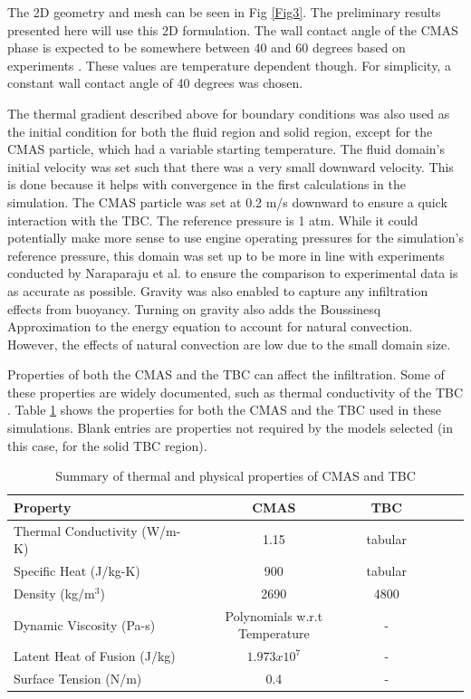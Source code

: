 \documentclass[conf]{new-aiaa}
\begin{document}
The 2D geometry and mesh can be seen in Fig \ref{Fig3}. The preliminary results presented here will use this 2D formulation. The wall contact angle of the CMAS phase is expected to be somewhere between 40 and 60 degrees based on experiments \cite{Naraparaju2019}. These values are temperature dependent though. For simplicity, a constant wall contact angle of 40 degrees was chosen.  


The thermal gradient described above for boundary conditions was also used as the initial condition for both the fluid region and solid region, except for the CMAS particle, which had a variable starting temperature. The fluid domain's initial velocity was set such that there was a very small downward velocity. This is done because it helps with convergence in the first calculations in the simulation. The CMAS particle was set at 0.2 m/s downward to ensure a quick interaction with the TBC. The reference pressure is 1 atm. While it could potentially make more sense to use engine operating pressures for the simulation's reference pressure, this domain was set up to be more in line with experiments conducted by Naraparaju et al. \cite{Naraparaju2014, Naraparaju2017, Naraparaju2019} to ensure the comparison to experimental data is as accurate as possible. Gravity was also enabled to capture any infiltration effects from buoyancy. Turning on gravity also adds the Boussinesq Approximation to the energy equation to account for natural convection. However, the effects of natural convection are low due to the small domain size.

Properties of both the CMAS and the TBC can affect the infiltration. Some of these properties are widely documented, such as thermal conductivity of the TBC \cite{Han2023}. Table \ref{tab:CMAS and TBC properties} shows the properties for both the CMAS and the TBC used in these simulations. Blank entries are properties not required by the models selected (in this case, for the solid TBC region).


\begin{table}
\caption{\label{tab:CMAS and TBC properties} Summary of thermal and physical properties of CMAS and TBC}
\centering
\begin{tabular}{lcccccc}
\hline
Property & CMAS& TBC\\\hline
Thermal Conductivity (W/m-K)& 1.15 \cite{Bakal2017} & tabular \cite{Han2023} \\
Specific Heat (J/kg-K)& 900 \cite{KAKUDA2015350} & tabular \cite{Han2023} \\
Density (kg/m$^3$)& 2690 \cite{BANSAL20153901}& 4800 \cite{KAKUDA20092583}\\
Dynamic Viscosity (Pa-s)& Polynomials w.r.t Temperature \cite{Sirigiri2018}& -\\
Latent Heat of Fusion (J/kg)& $1.973x10^7$ \cite{Costa2019}& -\\
Surface Tension (N/m)& 0.4 \cite{Bravo2020}& -\\
\hline
\end{tabular}
\end{table}
\end{document}
